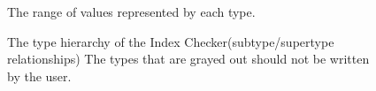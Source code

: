 \begin{figure}
\caption{The range of values represented by each type.}
\label{fig-index-figure}
\end{figure}

\begin{figure}
\caption{The type hierarchy of the Index Checker(subtype/supertype relationships)
The types that are grayed out should not be written by the user.}
\label{fig-index-heirarchy}
\end{figure}